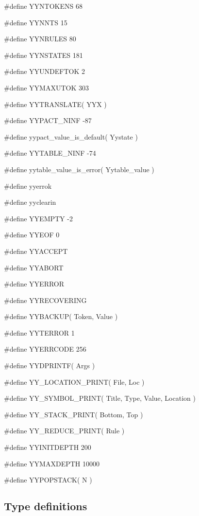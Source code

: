 \medskip
{\stt \#define YYNTOKENS 68}

\medskip
{\stt \#define YYNNTS 15}

\medskip
{\stt \#define YYNRULES 80}

\medskip
{\stt \#define YYNSTATES 181}

\medskip
{\stt \#define YYUNDEFTOK 2}

\medskip
{\stt \#define YYMAXUTOK 303}

\medskip
{\stt \#define YYTRANSLATE( YYX )}

\medskip
{\stt \#define YYPACT\_NINF -87}

\medskip
{\stt \#define yypact\_value\_is\_default( Yystate )}

\medskip
{\stt \#define YYTABLE\_NINF -74}

\medskip
{\stt \#define yytable\_value\_is\_error( Yytable\_value )}

\medskip
{\stt \#define yyerrok}

\medskip
{\stt \#define yyclearin}

\medskip
{\stt \#define YYEMPTY -2}

\medskip
{\stt \#define YYEOF 0}

\medskip
{\stt \#define YYACCEPT}

\medskip
{\stt \#define YYABORT}

\medskip
{\stt \#define YYERROR}

\medskip
{\stt \#define YYRECOVERING}

\medskip
{\stt \#define YYBACKUP( Token, Value )}

\medskip
{\stt \#define YYTERROR 1}

\medskip
{\stt \#define YYERRCODE 256}

\medskip
{\stt \#define YYDPRINTF( Args )}

\medskip
{\stt \#define YY\_LOCATION\_PRINT( File, Loc )}

\medskip
{\stt \#define YY\_SYMBOL\_PRINT( Title, Type, Value, Location )}

\medskip
{\stt \#define YY\_STACK\_PRINT( Bottom, Top )}

\medskip
{\stt \#define YY\_REDUCE\_PRINT( Rule )}

\medskip
{\stt \#define YYINITDEPTH 200}

\medskip
{\stt \#define YYMAXDEPTH 10000}

\medskip
{\stt \#define YYPOPSTACK( N )}


\subsection{Type definitions}


